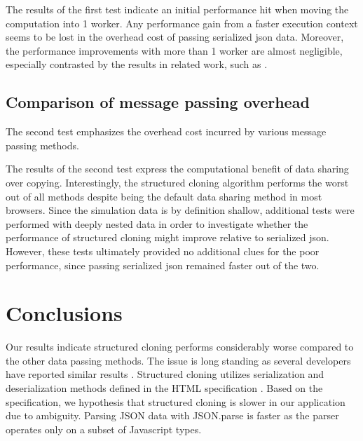\documentclass[conference, 9pt]{IEEEtran}
\begin{document}
The results of the first test indicate an initial performance hit when moving the computation into 1 worker. Any performance gain from a faster execution context seems to be lost in the overhead cost of passing serialized json data. Moreover, the performance improvements with more than 1 worker are almost negligible, especially contrasted by the results in related work, such as \cite{verdu}. 

\subsection{Comparison of message passing overhead}

The second test emphasizes the overhead cost incurred by various message passing methods.



The results of the second test express the computational benefit of data sharing over copying. Interestingly, the structured cloning algorithm performs the worst out of all methods despite being the default data sharing method in most browsers. Since the simulation data is by definition shallow, additional tests were performed with deeply nested data in order to investigate whether the performance of structured cloning might improve relative to serialized json. However, these tests ultimately provided no additional clues for the poor performance, since passing serialized json remained faster out of the two.


\section{Conclusions}
\label{sec:disc}

Our results indicate structured cloning performs considerably worse compared to the other data passing methods. The issue is long standing as several developers have reported similar results \cite{slowMessage}\cite{highPerWorkers}. Structured cloning utilizes serialization and deserialization methods defined in the HTML specification \cite{html}. Based on the specification, we hypothesis that structured cloning is slower in our application due to ambiguity. Parsing JSON data with JSON.parse is faster as the parser operates only on a subset of Javascript types. 
\end{document}
